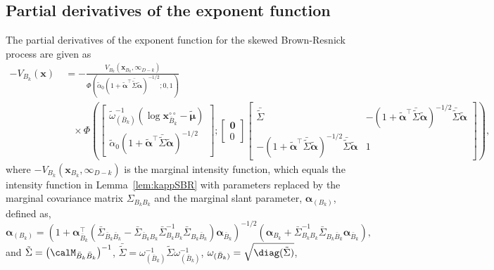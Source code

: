 \documentclass[12pt]{article}
\begin{document}
\subsection{Partial derivatives of the exponent function}

\begin{lemma}
\label{lem:partial_BR}
The partial derivatives of the exponent function for the skewed Brown-Resnick process are given as
\begin{align*}
-V_{B_k}(\bm x) &\ =  - \frac{V_{B_k}(\bm x_{B_k},\bm \infty_{D-k})}{\Phi\left(\tilde\alpha_0\left(1+\tilde{\bm\alpha}^\top\bar{\tilde\Sigma}\tilde{\bm\alpha}\right)^{-1/2}; 0, 1\right)} \\
& \quad \times 
\Phi\left(
\begin{bmatrix} 
\tilde\omega^{-1}_{(\bar B_k)}(\log \bm x_{\bar B_k}^{\circ\circ} - \tilde{\bm\mu})  \\
\tilde\alpha_0(1+\tilde{\bm\alpha}^\top\bar{\tilde\Sigma}\tilde{\bm\alpha})^{-1/2}
\end{bmatrix};
\begin{bmatrix}
\bm 0 \\ 0
\end{bmatrix}
\begin{bmatrix}
	\bar{\tilde\Sigma} & -(1+\tilde{\bm\alpha}^\top\bar{\tilde\Sigma}\tilde{\bm\alpha})^{-1/2}\bar{\tilde\Sigma}\tilde{\bm\alpha} \\
-(1+\tilde{\bm\alpha}^\top\bar{\tilde\Sigma}\tilde{\bm\alpha})^{-1/2}\bar{\tilde\Sigma}\tilde{\bm\alpha} &	1
\end{bmatrix} 
\right), 
\end{align*}
where $-V_{B_k}(\bm x_{B_k}, \bm \infty_{D-k})$ is the marginal intensity function, which equals the intensity function in Lemma~\ref{lem:kappSBR} with parameters replaced by the marginal covariance matrix $\Sigma_{B_kB_k}$ and the marginal slant parameter, $\bm\alpha_{(B_k)}$, defined as, 
$$\bm\alpha_{(B_k)} = \left(1+\bm\alpha_{\bar B_k}^\top\left(\bar\Sigma_{\bar B_k\bar B_k} -\bar \Sigma_{\bar B_k B_k}\bar\Sigma_{B_kB_k}^{-1}\bar\Sigma_{B_k\bar B_k}\right)\bm \alpha_{\bar B_k}\right)^{-1/2}\left(\bm \alpha_{B_k} + \bar\Sigma_{B_kB_k}^{-1}\bar\Sigma_{B_k\bar B_k}\bm\alpha_{\bar B_k}\right),$$
and
$\tilde\Sigma = \left(\calM_{\bar B_k\bar B_k}\right)^{-1}$, 
$\bar{\tilde\Sigma} = \omega_{(\bar B_k)}^{-1}\tilde\Sigma\omega_{(\bar B_k)}^{-1}$, $\omega_{(\bar B_k)}=\sqrt{\diag(\tilde\Sigma)}$,

\end{lemma}
\end{document}
